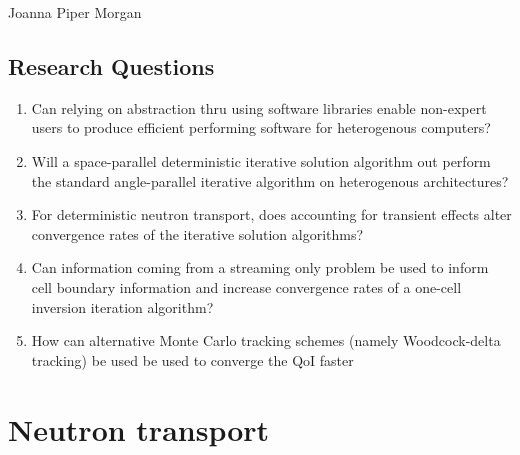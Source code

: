 Joanna Piper Morgan

\subsection{Research Questions}
\begin{enumerate}
    \item Can relying on abstraction thru using software libraries enable non-expert users to produce efficient performing software for heterogenous computers?
    \item Will a space-parallel deterministic iterative solution algorithm out perform the standard angle-parallel iterative algorithm on heterogenous architectures?
    \item For deterministic neutron transport, does accounting for transient effects alter convergence rates of the iterative solution algorithms?
    \item Can information coming from a streaming only problem be used to inform cell boundary information and increase convergence rates of a one-cell inversion iteration algorithm?
    \item How can alternative Monte Carlo tracking schemes (namely Woodcock-delta tracking) be used be used to converge the QoI faster
\end{enumerate}


\section{Neutron transport}

